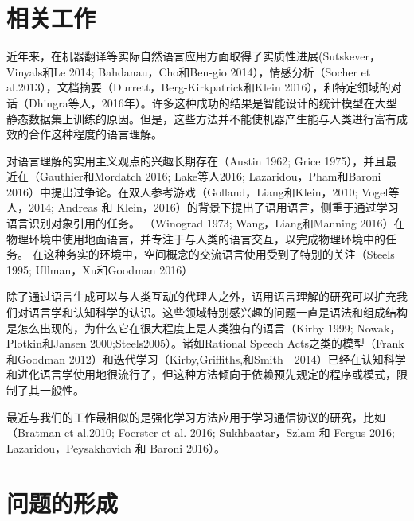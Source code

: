 \section{相关工作}
近年来，在机器翻译等实际自然语言应用方面取得了实质性进展(Sutskever，Vinyals和Le 2014; Bahdanau，Cho和Ben-gio 2014），情感分析（Socher et al.2013），文档摘要（Durrett，Berg-Kirkpatrick和Klein 2016），和特定领域的对话（Dhingra等人，2016年）。许多这种成功的结果是智能设计的统计模型在大型静态数据集上训练的原因。但是，这些方法并不能使机器产生能与人类进行富有成效的合作这种程度的语言理解。
\par
对语言理解的实用主义观点的兴趣长期存在（Austin 1962; Grice 1975），并且最近在（Gauthier和Mordatch 2016; Lake等人2016; Lazaridou，Pham和Baroni 2016）中提出过争论。在双人参考游戏（Golland，Liang和Klein，2010; Vogel等人，2014; Andreas 和 Klein，2016）的背景下提出了语用语言，侧重于通过学习语言识别对象引用的任务。 （Winograd 1973; Wang，Liang和Manning 2016）在物理环境中使用地面语言，并专注于与人类的语言交互，以完成物理环境中的任务。 在这种务实的环境中，空间概念的交流语言使用受到了特别的关注（Steels 1995; Ullman，Xu和Goodman 2016）
\par
除了通过语言生成可以与人类互动的代理人之外，语用语言理解的研究可以扩充我们对语言学和认知科学的认识。这些领域特别感兴趣的问题一直是语法和组成结构是怎么出现的，为什么它在很大程度上是人类独有的语言（Kirby 1999; Nowak，Plotkin和Jansen 2000;Steels2005）。诸如Rational Speech Acts之类的模型（Frank和Goodman 2012）和迭代学习（Kirby,Griffiths,和Smith　2014）已经在认知科学和进化语言学使用地很流行了，但这种方法倾向于依赖预先规定的程序或模式，限制了其一般性。
\par
最近与我们的工作最相似的是强化学习方法应用于学习通信协议的研究，比如（Bratman et al.2010; Foerster et al. 2016; Sukhbaatar，Szlam 和 Fergus 2016; Lazaridou，Peysakhovich 和 Baroni 2016）。


\section{问题的形成}

